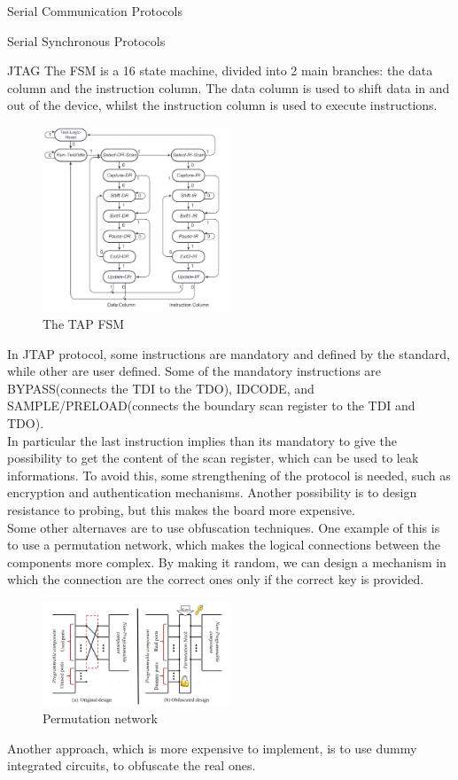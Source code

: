 \begin{section}{Serial Communication Protocols}
\begin{subsection}{Serial Synchronous Protocols}
\begin{subsubsection}{JTAG}
      The FSM is a 16 state machine, divided into 2 main branches: the data column and the
      instruction column. The data column is used to shift data in and out of the device, whilst the 
      instruction column is used to execute instructions. 
      \begin{figure}[H]
        \centering
        \includegraphics[width=0.5\textwidth]{img/hardware/tap fsm.png}
        \caption{The TAP FSM}
      \end{figure}
      In JTAP protocol, some instructions are mandatory and defined by the standard, while other are
      user defined. Some of the mandatory instructions are BYPASS(connects the TDI to the TDO),
      IDCODE, and SAMPLE/PRELOAD(connects the boundary scan register to the TDI and TDO).\\
      In particular the last instruction implies than its mandatory to give the possibility to get
      the content of the scan register, which can be used to leak informations. To avoid this, some
      strengthening of the protocol is needed, such as encryption and authentication mechanisms.
      Another possibility is to design resistance to probing, but this makes the board more
      expensive.\\
      Some other alternaves are to use obfuscation techniques. One example of this is to use a
      permutation network, which makes the logical connections between the components more complex.
      By making it random, we can design a mechanism in which the connection are the correct ones
      only if the correct key is provided. 
      \begin{figure}[H]
        \centering
        \includegraphics[width=0.5\textwidth]{img/hardware/permutation network.png}
        \caption{Permutation network}
      \end{figure}
      Another approach, which is more expensive to implement, is to use dummy integrated circuits,
      to obfuscate the real ones. 


\end{subsubsection}
\end{subsection}
\end{section}
